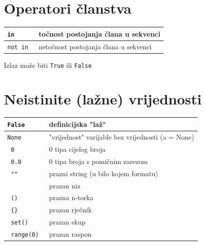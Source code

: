\documentclass[10pt]{article}
\begin{document}
    \section*{\color{NavyBlue} Operatori članstva}
    \begin{tabular}{|>{\tt}p{9.00cm}|>{}p{15.50cm}|}
        \hline
        in        & točnost postojanja člana u sekvenci         \\ \hline
        not in    & netočnost postojanja člana u sekvenci       \\ \hline
    \end{tabular}
    \begin{center}
        \footnotesize
        Izlaz može biti \texttt{True} ili \texttt{False}
    \end{center}

    \section*{\color{NavyBlue} Neistinite (lažne) vrijednosti}
    \begin{tabular}{|>{\tt}p{9.00cm}|>{}p{15.50cm}|}
        \hline
        False & definicijska "laž"                                      \\ \hline
        None  & "vrijednost" varijable bez vrijednosti (a = None)       \\ \hline                            
        0     & 0 tipa cijelog broja                                    \\ \hline
        0.0   & 0 tipa broja s pomičnim zarezom                         \\ \hline
        ""    & prazni string (u bilo kojem formatu)                    \\ \hline
        []    & prazan niz                                              \\ \hline
        ()    & prazna n-torka                                          \\ \hline
        \{\}  & prazan rječnik                                          \\ \hline
        set() & prazan skup                                             \\ \hline
        range(0) & prazan raspon                                        \\ \hline
    \end{tabular}
\end{document}
